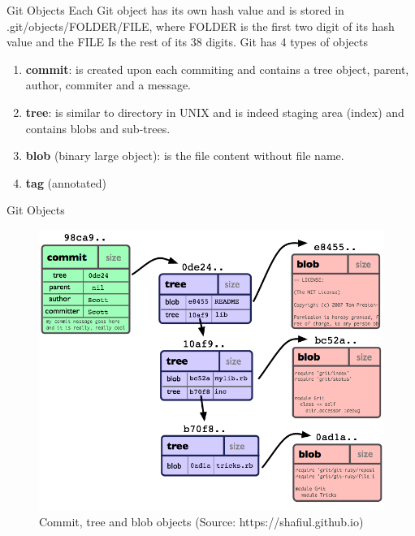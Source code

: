 \begin{frame}{Git Objects}
Each Git object has its own hash value and is
stored in .git/objects/FOLDER/FILE,
where FOLDER is the first two digit of its hash value
and the FILE Is the rest of its 38 digits. Git has 4 types of objects
\begin{enumerate}
\item\textbf{commit}: is created upon each commiting and contains a tree object, parent, author, commiter
and a message.
\item \textbf{tree}: is similar to directory in UNIX and is indeed staging area (index) and contains 
blobs and sub-trees. 
\item \textbf{blob} (binary large object): is the file content without
file name. 
\item\textbf{tag} (annotated)
\end{enumerate}
\end{frame}

\begin{frame}{Git Objects}
  \begin{figure}
    \begin{center}
    \includegraphics[width=0.8\linewidth]{pics/objects.png}
    \vspace{-0.3cm}
    \caption{\footnotesize Commit, tree and blob objects (Source: https://shafiul.github.io)}
  \end{center}
\end{figure}
\end{frame}

